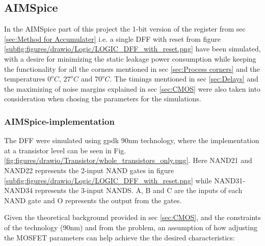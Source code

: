\subsection{AIMSpice}
In the AIMSpice part of this project the 1-bit version of the register from sec \ref{sec:Method for Accumulater} i.e. a single DFF with reset from figure \ref{subfig:figures/drawio/Logic/LOGIC_DFF_with_reset.png} have been simulated, with a desire for minimizing the static leakage power consumption while keeping the functionality for all the corners mentioned in sec \ref{sec:Process corners} and the temperatures $0^o C$, $27^o C$ and $70^o C$. The timings mentioned in sec \ref{sec:Delays} and the maximizing of noise margins explained in sec \ref{sec:CMOS} were also taken into consideration when chosing the parameters for the simulations.

\subsubsection{AIMSpice-implementation}
The DFF were simulated using gpdk 90nm technology, where the implementation at a transistor level can be seen in Fig. \ref{fig:figures/drawio/Transistor/whole_transistors_only.png}. Here NAND21 and NAND22 represents the 2-input NAND gates in figure \ref{subfig:figures/drawio/Logic/LOGIC_DFF_with_reset.png} while NAND31-NAND34 represents the 3-input NANDS. A, B and C are the inputs of each NAND gate and O represents the output from the gates.


Given the theoretical background provided in sec \ref{sec:CMOS}, and the constraints of the technology (90nm) and from the problem, an assumption of how adjusting the MOSFET parameters can help achieve the the desired characteristics: 

